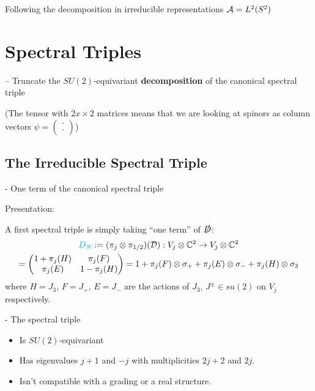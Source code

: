 \linea

Following the decomposition in irreducible representations $\mathcal A = L^2(S^2)$

\section{Spectral Triples}

 --  Truncate the $SU(2)$-equivariant \textbf{decomposition} of the canonical spectral triple

(The tensor with $2x\times 2$ matrices means that we are looking at spinors as column vectors $\psi = \begin{pmatrix} \cdot \\ \cdot \end{pmatrix}$)

\subsection{The Irreducible Spectral Triple}
 
 - One term of the canonical spectral triple
 
Presentation:

A first spectral triple is simply taking ``one term'' of $\slashed D$:
\begin{multline}
    \textcolor{cyan}{D_N} 
    := (\pi_j \otimes \pi_{1/2})(\mathcal D): V_j \otimes \mathbb{C}^2 \to V_j \otimes \mathbb{C}^2 \\
    = \begin{pmatrix} 1 + \pi_j(H) & \pi_j(F) \\ \pi_j(E) & 1 - \pi_j(H)\end{pmatrix} 
    = 1 + \pi_j(F) \otimes \sigma_+ + \pi_j(E) \otimes \sigma_- + \pi_j(H) \otimes \sigma_3
\end{multline} where $H = J_3$, $F = J_+$, $E = J_-$ are the actions of $J_3$, $J^\pm \in su(2)$ on $V_j$ respectively.

- The spectral triple 
    \begin{itemize}
        
    \item Is $SU(2)$-equivariant
    
    \item Has eigenvalues $j+1$ and $-j$ with multiplicities $2j+2$ and $2j$.
        
    \item Isn't compatible with a grading or a real structure.
    \end{itemize}
    
